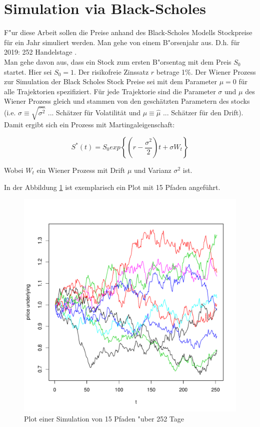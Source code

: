 \documentclass[10pt,a4paper]{report}\usepackage[]{graphicx}\usepackage[]{color}
\makeatletter
\def\maxwidth{ %
  \ifdim\Gin@nat@width>\linewidth
    \linewidth
  \else
    \Gin@nat@width
  \fi
}
\makeatother
\begin{document}
\section{Simulation via Black-Scholes}

F"ur diese Arbeit sollen die Preise anhand des Black-Scholes Modells Stockpreise für ein Jahr simuliert werden. Man gehe von einem B"orsenjahr aus. D.h. für 2019: 252 Handelstage \cite[]{boersewien2019}.\\
Man gehe davon aus, dass ein Stock zum ersten B"orsentag mit dem Preis $S_0$ startet. Hier sei $S_0=1$. Der risikofreie Zinssatz $r$ betrage 1\%. Der Wiener Prozess zur Simulation der Black Scholes Stock Preise sei mit dem Parameter $\mu=0$ für alle Trajektorien spezifiziert. Für jede Trajektorie sind die Parameter $\sigma$ und $\mu$ des Wiener Prozess gleich und stammen von den geschätzten Parametern des stocks (i.e. $\sigma \equiv \sqrt{\hat{\sigma^2}}$ ... Schätzer für Volatilität und $\mu \equiv \hat{\mu}$ ... Schätzer für den Drift). Damit ergibt sich ein Prozess mit Martingaleigenschaft:

$$S^*(t)=S_0 exp\left\{  (r-\frac{\sigma^2}{2})t + \sigma W_t\right\}$$

Wobei $W_t$ ein Wiener Prozess mit Drift $\mu$ und Varianz $\sigma^2$ ist.

In der Abbildung \ref{fig:pfade252} ist exemplarisch ein Plot mit 15 Pfaden angeführt.


\begin{figure}[H]

\includegraphics[width=\maxwidth]{figure/unnamed-chunk-14-1} 

\caption{Plot einer Simulation von 15 Pfaden "uber 252 Tage}
\label{fig:pfade252}
\end{figure}
\end{document}
